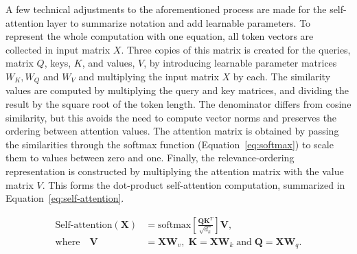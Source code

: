 \documentclass[english,twoside,openright]{UH_DS_MSc}
\begin{document}
A few technical adjustments to the aforementioned process are made for the self-attention layer to summarize notation and add learnable parameters. To represent the whole computation with one equation, all token vectors are collected in input matrix $X$. Three copies of this matrix is created for the queries, matrix $Q$, keys, $K$, and values, $V$, by introducing learnable parameter matrices $W_K, W_Q$ and $W_V$ and multiplying the input matrix $X$ by each. The similarity values are computed by multiplying the query and key matrices, and dividing the result by the square root of the token length. The denominator differs from cosine similarity, but this avoids the need to compute vector norms and preserves the ordering between attention values. The attention matrix is obtained by passing the similarities through the softmax function (Equation~\ref{eq:softmax}) to scale them to values between zero and one. Finally, the relevance-ordering representation is constructed by multiplying the attention matrix with the value matrix $V$. This forms the dot-product self-attention computation, summarized in Equation~\ref{eq:self-attention}.
 


\begin{align}
    \text{Self-attention}(\mathbf{X}) &= \text{softmax} \left[ \frac{\mathbf{Q}\mathbf{K}^T }{\sqrt{d_k}} \right] \mathbf{V}, \label{eq:self-attention} \\
    \nonumber\text{where} \quad \mathbf{V} &= \mathbf{X} \mathbf{W}_v, \; \mathbf{K} = \mathbf{X} \mathbf{W}_k \; \text{and} \; \mathbf{Q} = \mathbf{X} \mathbf{W}_q.
\end{align}
\end{document}
